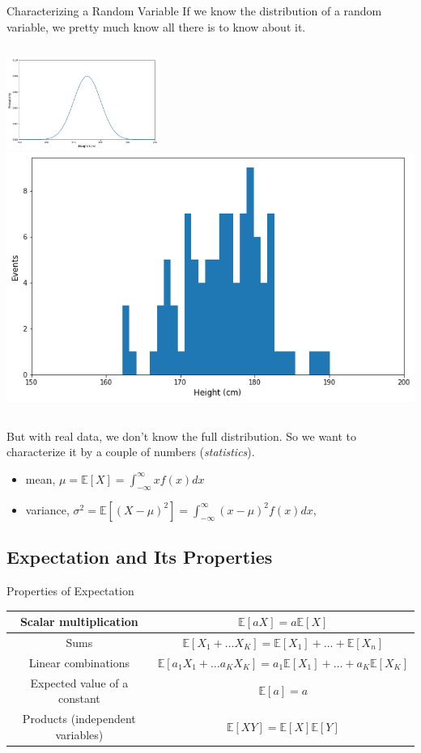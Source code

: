 \documentclass{beamer}
\begin{document}
\begin{frame}{Characterizing a Random Variable}
	If we know the distribution of a random variable, we pretty much know all there is to know about it. 
	\newline
	\begin{columns}
		\includegraphics[height=3cm]{continouos_random_variable}
		\includegraphics[height=3 cm]{real_data}
	\end{columns}

But with real data, we don't know the full distribution. So we want to characterize it by a couple of numbers (\emph{statistics}).
\footnotesize{
	\begin{itemize}
		\item mean, $\mu = \mathbb{E}[X] = \int_{-\infty}^{\infty} xf(x)dx$
		\item variance, 
		$\sigma^2 = \mathbb{E}[(X-\mu)^2] =\int_{-\infty}^{\infty} (x-\mu)^2f(x)dx$,
\end{itemize}}
\end{frame}

\subsection{Expectation and Its Properties}
\begin{frame}{Properties of Expectation}
	\renewcommand{\arraystretch}{1.4}
	\footnotesize{\tiny {\tiny }}{
	\begin{table}[bt]
		\begin{tabular}{|c|c|} \hline
Scalar multiplication & $\mathbb{E}[aX] = a\mathbb{E}[X]$ \\ \hline
Sums & $\mathbb{E}[X_1+\ldots X_K] =  \mathbb{E}[X_1] +\ldots + \mathbb{E}[X_n]$ \\ \hline
Linear combinations & $\mathbb{E}[a_1X_1+\ldots a_KX_K] =  a_1\mathbb{E}[X_1] +\ldots + a_K\mathbb{E}[X_K]$ \\ \hline
Expected value of a constant & $\mathbb{E}[a] = a$ \\ \hline
Products (independent variables) & $\mathbb{E}[XY] = \mathbb{E}[X] \mathbb{E}[Y]$ \\ \hline
		\end{tabular}
	\end{table}
}
\end{frame}
\end{document}
